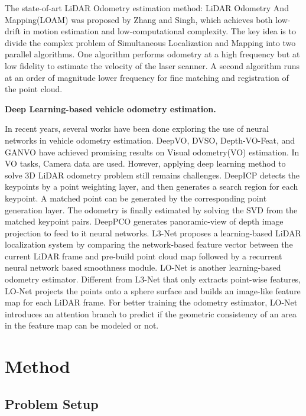 \documentclass[sigconf]{acmart}
\newcommand{\bfsection}[1]{\vspace*{0.1cm}\noindent\textbf{#1.}}
\begin{document}
The state-of-art LiDAR Odometry estimation method: LiDAR Odometry And Mapping(LOAM)\cite{LOAM} was proposed by Zhang and Singh, which achieves both low-drift in motion estimation and low-computational complexity. The key idea is to divide the complex problem of Simultaneous Localization and Mapping into two parallel algorithms. One algorithm performs odometry at a high frequency but at low fidelity to estimate the velocity of the laser scanner. A second algorithm runs at an order of magnitude lower frequency for fine matching and registration of the point cloud.


\bfsection{Deep Learning-based vehicle odometry estimation}

In recent years, several works have been done exploring the use of neural networks in vehicle odometry estimation. DeepVO\cite{DeepVO}, DVSO\cite{DVSO}, Depth-VO-Feat\cite{Depth-VO-Feat}, and GANVO\cite{GANVO} have achieved promising results on Visual odometry(VO) estimation. In VO tasks, Camera data are used. However, applying deep learning method to solve 3D LiDAR odometry problem still remains challenges. DeepICP\cite{Deep_icp} detects the keypoints by a point weighting layer, and then generates a search region for each keypoint. A matched point can be generated by the corresponding point generation layer. The odometry is finally estimated by solving the SVD from the matched keypoint pairs. DeepPCO\cite{DeepPCO} generates panoramic-view of depth image projection to feed to it neural networks. L3-Net \cite{lu2019l3} proposes a learning-based LiDAR localization system by comparing the network-based feature vector between the current LiDAR frame and pre-build point cloud map followed by a recurrent neural network based smoothness module. LO-Net\cite{LO-Net} is another learning-based odometry estimator. Different from L3-Net that only extracts point-wise features, LO-Net  projects the points onto a sphere surface and builds an image-like feature map for each LiDAR frame. For better training the odometry estimator, LO-Net introduces an attention branch to predict if the geometric consistency of an area in the feature map can be modeled or not.

\section{Method}
\subsection{Problem Setup}
\end{document}
